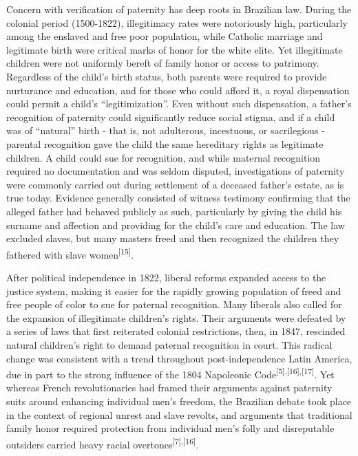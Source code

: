 \documentclass{article}
\begin{document}
Concern with verification of paternity has deep roots in Brazilian law. During
the colonial period (1500-1822), illegitimacy rates were notoriously high,
particularly among the enslaved and free poor population, while Catholic
marriage and legitimate birth were critical marks of honor for the white elite.
Yet illegitimate children were not uniformly bereft of family honor or access to
patrimony. Regardless of the child’s birth status, both parents were required to
provide nurturance and education, and for those who could afford it, a royal
dispensation could permit a child’s “legitimization”. Even without such
dispensation, a father’s recognition of paternity could significantly reduce
social stigma, and if a child was of “natural” birth - that is, not adulterous,
incestuous, or sacrilegious - parental recognition gave the child the same
hereditary rights as legitimate children. A child could sue for recognition, and
while maternal recognition required no documentation and was seldom disputed,
investigations of paternity were commonly carried out during settlement of a
deceased father’s estate, as is true today. Evidence generally consisted of
witness testimony confirming that the alleged father had behaved publicly as
such, particularly by giving the child his surname and affection and providing
for the child’s care and education. The law excluded slaves, but many masters
freed and then recognized the children they fathered with slave women\textsuperscript{[}\textsuperscript{15}\textsuperscript{]}.

After political independence in 1822, liberal reforms expanded access to the
justice system, making it easier for the rapidly growing population of freed and
free people of color to sue for paternal recognition. Many liberals also called
for the expansion of illegitimate children’s rights. Their arguments were
defeated by a series of laws that first reiterated colonial restrictions, then,
in 1847, rescinded natural children’s right to demand paternal recognition in
court. This radical change was consistent with a trend throughout
post-independence Latin America, due in part to the strong influence of the 1804
Napoleonic Code\textsuperscript{[}\textsuperscript{5}\textsuperscript{]}\textsuperscript{,}\textsuperscript{[}\textsuperscript{16}\textsuperscript{]}\textsuperscript{,}\textsuperscript{[}\textsuperscript{17}\textsuperscript{]}. Yet whereas French revolutionaries had framed their arguments against
paternity suits around enhancing individual men’s freedom, the Brazilian debate
took place in the context of regional unrest and slave revolts, and arguments
that traditional family honor required protection from individual men’s folly
and disreputable outsiders carried heavy racial overtones\textsuperscript{[}\textsuperscript{7}\textsuperscript{]}\textsuperscript{,}\textsuperscript{[}\textsuperscript{16}\textsuperscript{]}.
\end{document}
